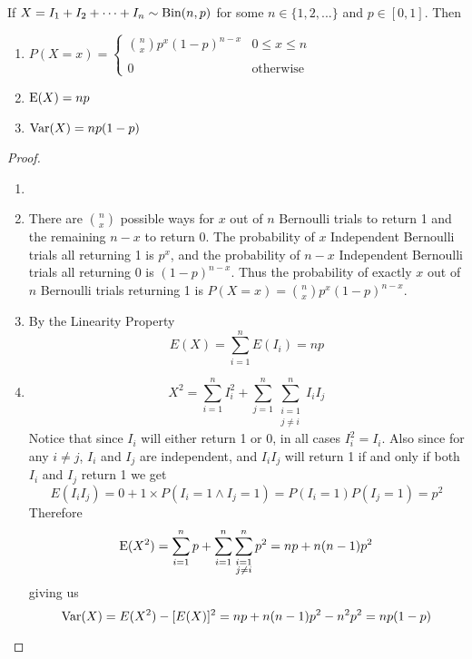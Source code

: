 \begin{theorem}
    If $X=I_1+I_2+\cdots +I_n \sim \textup{Bin}(n,p)$ for some $n\in\{1,2,...\}$ and $p\in[0,1]$. Then
    \begin{enumerate}
        \item $P(X=x)=\begin{cases}
            \displaystyle\binom n x p^x(1-p)^{n-x} & 0\le x \le n \\\\
            0 & \text{otherwise}
        \end{cases}$
        \item $\textup{E}(X)=np$
        \item $\textup{Var}(X)=np(1-p)$
    \end{enumerate}
    \begin{proof}
    
        \begin{enumerate}
            \item[]
            \item There are $\binom nx$ possible ways for $x$ out of $n$ Bernoulli trials to return 1 and the remaining $n-x$ to return 0. The probability of $x$ Independent Bernoulli trials all returning 1 is $p^x$, and the probability of $n-x$ Independent Bernoulli trials all returning $0$ is $(1-p)^{n-x}$. Thus the probability of exactly $x$ out of $n$ Bernoulli trials returning 1 is $P(X=x)=\binom n x p^x(1-p)^{n-x}$. 
            \item By the Linearity Property
            \[
                E(X)=\sum_{i=1}^n E(I_i)=np
            \]
            \item 
            \[
                X^2=\sum_{i=1}^n I_i^2 + \sum_{j=1}^n\sum_{\substack{i=1 \\ j\ne i}}^n I_i I_j
            \]
            Notice that since $I_i$ will either return 1 or 0, in all cases $I_i^2=I_i$. Also since for any $i\ne j$, $I_i$ and $I_j$ are independent, and $I_i I_j$ will return 1 if and only if both $I_i$ and $I_j$ return 1 we get
            \[
                E(I_i I_j)=0+1\times P(I_i=1 \land I_j=1)=P(I_i=1)P(I_j=1)=p^2
            \]
            Therefore
            \[
                \textup{E}(X^2)=\sum_{i=1}^n p + \sum_{i=1}^n\sum_{\substack{i=1 \\ j\ne i}}^n p^2 = np+n(n-1)p^2
            \]
            giving us
            \[
                \textup{Var}(X)=E(X^2)-[E(X)]^2= np+n(n-1)p^2 - n^2p^2=np(1-p)
            \]
        \end{enumerate}
    \end{proof}
    
    
\end{theorem}

